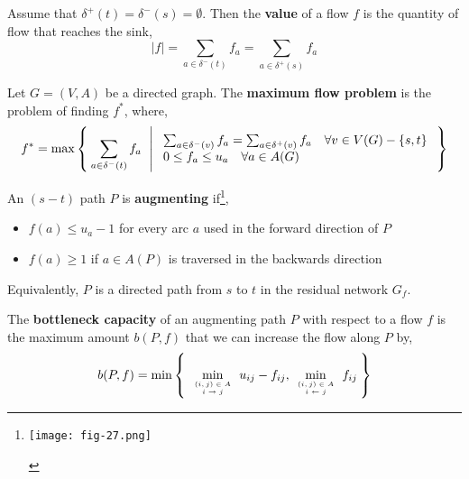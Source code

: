 	\begin{defn}
		Assume that $\delta^+(t) = \delta^-(s) = \emptyset$. Then the \textbf{value} of a flow $f$ is the quantity of flow that reaches the sink,
		\[|f| = \sum_{a \in \delta^-(t)} f_a = \sum_{a \in \delta^+(s)} f_a\]
	\end{defn}

	\begin{defn}
		Let $G = (V, A)$ be a directed graph. The \textbf{maximum flow problem} is the problem of finding $f^*$, where,
		\[
		  f^* = \max \Set{ \sum_{a \in \delta^-(t)} f_a \ | \begin{array}{l}
		    \sum_{a \in \delta^-(v)} f_a = \sum_{a \in \delta^+(v)} f_a \quad \forall v \in V(G) - \{s,t\} \\
		    0 \leq f_a \leq u_a \quad \forall a \in A(G)
		  \end{array}}
		\]
	\end{defn}

	\begin{defn}
		An $(s-t)$ path $P$ is \textbf{augmenting} if\footnote{\begin{center}\texttt{[image: fig-27.png]}\end{center}},
		\begin{itemize}
			\item $f(a) \leq u_a - 1$ for every arc $a$ used in the forward direction of $P$
			\item $f(a) \geq 1$ if $a \in A(P)$ is traversed in the backwards direction
		\end{itemize}
		\noindent Equivalently, $P$ is a directed path from $s$ to $t$ in the residual network $G_f$.
	\end{defn}

	\begin{defn}
		The \textbf{bottleneck capacity} of an augmenting path $P$ with respect to a flow $f$ is the maximum amount $b(P, f)$ that we can increase the flow along $P$ by,
		\[
		b(P, f) = \min \Set{ \min_{\tiny\begin{array}{c} (i,j) \in A \\ i \rightarrow j \end{array}} u_{ij} - f_{ij}, \min_{\tiny\begin{array}{c} (i,j) \in A \\ i \leftarrow j \end{array}} f_{ij}}
		\]
	\end{defn}

